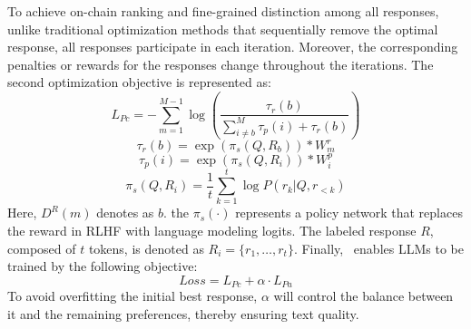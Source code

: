 To achieve on-chain ranking and fine-grained distinction among all responses, unlike traditional optimization methods that sequentially remove the optimal response, all responses participate in each iteration. Moreover, the corresponding penalties or rewards for the responses change throughout the iterations.
The second optimization objective is represented as:
\begin{equation}
   L_{Pc} = -\sum_{m=1}^{M-1} \log \left( \frac{ \tau_r(b)}{\sum_{i \ne b}^{M} \tau_p(i) + \tau_r(b)} \right)
\end{equation}
\begin{equation}
    \tau_r (b)= \exp(\pi_s(Q, R_{b})) * W_{m}^{r}
\end{equation}
\begin{equation}
    \tau_p (i)= \exp(\pi_s(Q, R_i)) * W_{i}^{p}
\end{equation}
\begin{equation}
    \pi_s(Q, R_i) = \frac{1}{t} {\textstyle \sum_{k=1}^{t}\log P(r_k|Q, r_{<k}) }
\end{equation}
Here, \(D^R(m)\) denotes as \(b\). the \(\pi_s(\cdot)\) represents a policy network that replaces the reward in RLHF with language modeling logits. The labeled response \(R\), composed of \(t\) tokens, is denoted as \(R_i = \{r_1,\ldots,r_t\}\).
Finally, \shortname\ enables LLMs to be trained by the following objective:
\begin{equation}
    Loss= L_{Pc} + \alpha \cdot L_{Pa}
    \label{eq::final}
\end{equation}
To avoid overfitting the initial best response, \(\alpha\) will control the balance between it and the remaining preferences, thereby ensuring text quality.


